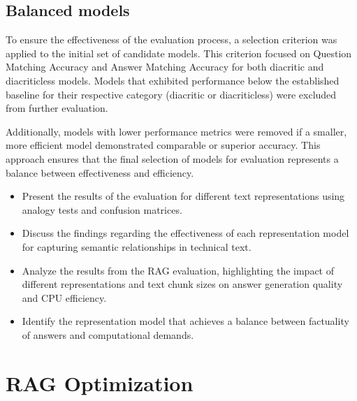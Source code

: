 


\subsection{Balanced models}
To ensure the effectiveness of the evaluation process, a selection criterion was applied to the initial set of candidate models.
This criterion focused on Question Matching Accuracy and Answer Matching Accuracy for both diacritic and diacriticless models.
Models that exhibited performance below the established baseline for their respective category (diacritic or diacriticless) were excluded from further evaluation.

Additionally, models with lower performance metrics were removed if a smaller, more efficient model demonstrated comparable or superior accuracy.
This approach ensures that the final selection of models for evaluation represents a balance between effectiveness and efficiency.



\begin{itemize}
    \item Present the results of the evaluation for different text representations using analogy tests and confusion matrices.
    \item Discuss the findings regarding the effectiveness of each representation model for capturing semantic relationships in technical text.
    \item Analyze the results from the RAG evaluation, highlighting the impact of different representations and text chunk sizes on answer generation quality and CPU efficiency.
    \item Identify the representation model that achieves a balance between factuality of answers and computational demands.
\end{itemize}

\section{RAG Optimization}